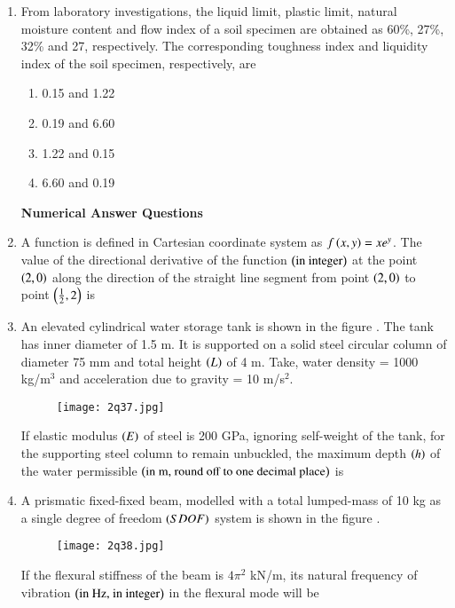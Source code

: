 \documentclass[journal,12pt,onecolumn]{article}
\theoremstyle{remark}
\begin{document}
\begin{enumerate}
\item From laboratory investigations, the liquid limit, plastic limit, natural moisture content and flow index of a soil specimen are obtained as 60\%, 27\%, 32\% and 27, respectively. The corresponding toughness index and liquidity index of the soil specimen, respectively, are

\hfill{}

\begin{multicols}{2}
\begin{enumerate}
    \item 0.15 and 1.22
    \item 0.19 and 6.60
    \item 1.22 and 0.15
    \item 6.60 and 0.19
\end{enumerate}
\end{multicols}

\textbf{Numerical Answer Questions}
\item A function is defined in Cartesian coordinate system as $f\left(x,y\right) = xe^y$. The value of the directional derivative of the function $\left(\text{in integer}\right)$ at the point $\left(2, 0\right)$ along the direction of the straight line segment from point $\left(2, 0\right)$ to point $\left(\frac{1}{2}, 2\right)$ is \underline{\hspace{2cm}}

\hfill{}

\item An elevated cylindrical water storage tank is shown in the figure . The tank has inner diameter of 1.5 m. It is supported on a solid steel circular column of diameter 75 mm and total height $\left(L\right)$ of 4 m. Take, water density = 1000 kg/m$^3$ and acceleration due to gravity = 10 m/s$^2$.
\begin{figure}[H]
    \centering
    \texttt{[image: 2q37.jpg]}
    \caption{}
    \label{fig:q37}
\end{figure}
If elastic modulus $\left(E\right)$ of steel is 200 GPa, ignoring self-weight of the tank, for the supporting steel column to remain unbuckled, the maximum depth $\left(h\right)$ of the water permissible $\left(\text{in m, round off to one decimal place}\right)$ is \underline{\hspace{2cm}}

\hfill{}

\item A prismatic fixed-fixed beam, modelled with a total lumped-mass of 10 kg as a single degree of freedom $\left(SDOF\right)$ system is shown in the figure .
\begin{figure}[H]
    \centering
    \texttt{[image: 2q38.jpg]}
    \caption{}
    \label{fig:q38}
\end{figure}
If the flexural stiffness of the beam is $4\pi^2$ kN/m, its natural frequency of vibration $\left(\text{in Hz, in integer}\right)$ in the flexural mode will be \underline{\hspace{2cm}}


\end{enumerate}
\end{document}
